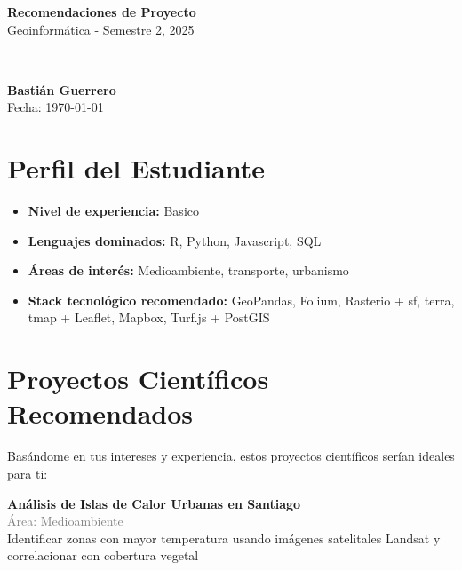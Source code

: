 \documentclass[11pt,a4paper]{article}
\begin{document}
\begin{center}
    {\Huge \textbf{Recomendaciones de Proyecto}}\\[0.5cm]
    {\Large \textcolor{usachblue}{Geoinformática - Semestre 2, 2025}}\\[0.3cm]
    \rule{\textwidth}{0.5pt}\\[0.3cm]
    {\LARGE \textbf{Bastián Guerrero}}\\[0.2cm]
    {\large Fecha: \today}
\end{center}

\vspace{0.5cm}

\section*{ Perfil del Estudiante}

\begin{tcolorbox}[colback=blue!5,colframe=usachblue,title=Resumen de tu Perfil]
\begin{itemize}[leftmargin=*]
    \item \textbf{Nivel de experiencia:} Basico
    \item \textbf{Lenguajes dominados:} R, Python, Javascript, SQL
    \item \textbf{Áreas de interés:} Medioambiente, transporte, urbanismo
    \item \textbf{Stack tecnológico recomendado:} GeoPandas, Folium, Rasterio + sf, terra, tmap + Leaflet, Mapbox, Turf.js + PostGIS
\end{itemize}
\end{tcolorbox}


\section*{ Proyectos Científicos Recomendados}

Basándome en tus intereses y experiencia, estos proyectos científicos serían ideales para ti:


\begin{tcolorbox}[colback=green!5,colframe=darkgreen,title={\small Proyecto Científico \#1}]
\textbf{Análisis de Islas de Calor Urbanas en Santiago}\\[0.2cm]
\textcolor{gray}{\small Área: Medioambiente}\\[0.2cm]
Identificar zonas con mayor temperatura usando imágenes satelitales Landsat y correlacionar con cobertura vegetal
\end{tcolorbox}
\end{document}
